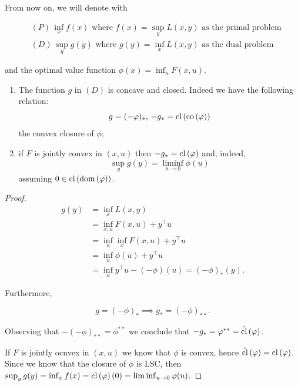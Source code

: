 From now on, we will denote with

\begin{align*}
    &(P) \, \inf_x f(x) \text{ where } f(x) = \sup_y L(x,y) \text{ as the primal problem}\\
    &(D) \, \sup_y g(y) \text{ where } g(y) = \inf_x L(x,y) \text{ as the dual problem} 
\end{align*}

and the optimal value function $\phi(x) = \inf_u F(x,u)$.

\begin{theorem}[Main]
    
    \begin{enumerate}
        \item The function $g$ in $(D)$ is concave and closed. Indeed we have the following relation:
            \[ g = (-\varphi)_*,\, -g_* = \mathrm{cl}\left(\mathrm{co}\left(\varphi\right)\right) \]
            the convex closure of $\phi$;
        \item if $F$ is jointly convex in $(x,u)$ then $-g_* = \mathrm{cl}\left(\varphi\right)$ and, indeed,
            \[ \sup_y g(y) = \liminf_{u \to 0} \phi(u) \]
            assuming $0 \in \mathrm{cl}\left(\mathrm{dom}\left(\varphi\right)\right)$.
    \end{enumerate}

\end{theorem}

\begin{proof}
    
    \begin{align*}
        g(y) &= \inf_x L(x,y) \\
            &= \inf_{x,u} F(x,u) + y^\top u \\
            &= \inf_u \inf_x F(x,u) + y^\top u \\
            &= \inf_u \phi(u) + y^\top u \\
            &= \inf_u y^\top u - (-\phi)(u) = (-\phi)_*(y).
    \end{align*}

    Furthermore, 

    \[ g = (-\phi)_* \implies g_* = (-\phi)_{**}. \]

    Observing that $-(-\phi)_{**} = \phi^{**}$ we conclude that $-g_* = \varphi^{**} = \check{\mathrm{cl}}\left(\varphi\right)$. 

    If $F$ is jointly ocnvex in $(x,u)$ we know that $\phi$ is convex, hence $\check{\mathrm{cl}}\left(\varphi\right) = \mathrm{cl}\left(\varphi\right)$. Since we know that the closure of $\phi$ is LSC, then $\sup_y g(y) = \inf_x f(x) = \mathrm{cl}\left(\varphi\right)(0) = \liminf_{u \to 0} \varphi(u)$.
 
\end{proof}

